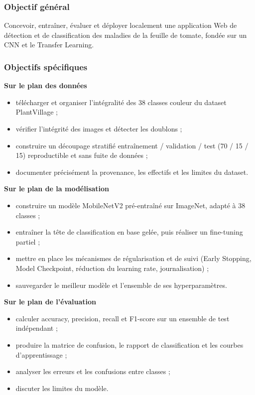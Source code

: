 \documentclass[10pt,a4paper]{article}
\begin{document}
\subsubsection{Objectif général}

Concevoir, entraîner, évaluer et déployer localement une application Web de détection et de classification des maladies de la feuille de tomate, fondée sur un CNN et le Transfer Learning.

\subsubsection{Objectifs spécifiques}

\textbf{Sur le plan des données}

\begin{itemize}
\item télécharger et organiser l'intégralité des 38 classes couleur du dataset PlantVillage ;
\item vérifier l'intégrité des images et détecter les doublons ;
\item construire un découpage stratifié entraînement / validation / test (70 / 15 / 15) reproductible et sans fuite de données ;
\item documenter précisément la provenance, les effectifs et les limites du dataset.
\end{itemize}

\textbf{Sur le plan de la modélisation}

\begin{itemize}
\item construire un modèle MobileNetV2 pré-entraîné sur ImageNet, adapté à 38 classes ;
\item entraîner la tête de classification en base gelée, puis réaliser un fine-tuning partiel ;
\item mettre en place les mécanismes de régularisation et de suivi (Early Stopping, Model Checkpoint, réduction du learning rate, journalisation) ;
\item sauvegarder le meilleur modèle et l'ensemble de ses hyperparamètres.
\end{itemize}

\textbf{Sur le plan de l'évaluation}

\begin{itemize}
\item calculer accuracy, precision, recall et F1-score sur un ensemble de test indépendant ;
\item produire la matrice de confusion, le rapport de classification et les courbes d'apprentissage ;
\item analyser les erreurs et les confusions entre classes ;
\item discuter les limites du modèle.
\end{itemize}
\end{document}
